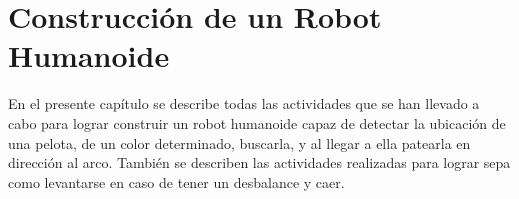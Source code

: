 \chapter{Construcci\'on de un Robot Humanoide}\label{chapter:introAdesarrollo}

En el presente capítulo se describe todas las actividades que se han llevado a cabo para lograr construir un robot humanoide capaz de detectar la ubicación de una pelota, de un color determinado, buscarla, y al llegar a ella patearla en direcci\'on al arco. También se describen las actividades realizadas para lograr sepa como levantarse en caso de tener un desbalance y caer.  



